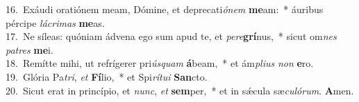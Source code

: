 {16.~}Exáudi oratiónem meam, Dómine, et deprecati\textit{ó}\textit{nem} \textbf{me}am:~* áuribus pércipe \textit{lá}\textit{cri}\textit{mas} \textbf{me}as.\\
{17.~}Ne síleas: quóniam ádvena ego sum apud te, et \textit{pe}\textit{re}\textbf{grí}nus,~* sicut om\textit{nes} \textit{pa}\textit{tres} \textbf{me}i.\\
{18.~}Remítte mihi, ut refrígerer pri\textit{ús}\textit{quam} \textbf{á}beam,~* et ám\textit{pli}\textit{us} \textit{non} \textbf{e}ro.\\
{19.~}Glória Pa\textit{tri}, \textit{et} \textbf{Fí}lio,~* et Spi\textit{rí}\textit{tu}\textit{i} \textbf{San}cto.\\
{20.~}Sicut erat in princípio, et \textit{nunc}, \textit{et} \textbf{sem}per,~* et in sǽcula sæ\textit{cu}\textit{ló}\textit{rum}. \textbf{A}men.\\
